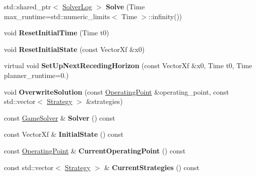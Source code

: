 \begin{DoxyCompactItemize}
\item 
std\+::shared\+\_\+ptr$<$ \hyperlink{classilqgames_1_1_solver_log}{Solver\+Log} $>$ {\bfseries Solve} (Time max\+\_\+runtime=std\+::numeric\+\_\+limits$<$ Time $>$\+::infinity())\hypertarget{classilqgames_1_1_problem_ab12b009e19551f6578af998789497927}{}\label{classilqgames_1_1_problem_ab12b009e19551f6578af998789497927}

\item 
void {\bfseries Reset\+Initial\+Time} (Time t0)\hypertarget{classilqgames_1_1_problem_a559eb8753ba5b82afeb6c69dd722a306}{}\label{classilqgames_1_1_problem_a559eb8753ba5b82afeb6c69dd722a306}

\item 
void {\bfseries Reset\+Initial\+State} (const Vector\+Xf \&x0)\hypertarget{classilqgames_1_1_problem_ac59f8a49b028baa3d72cb065d35b8193}{}\label{classilqgames_1_1_problem_ac59f8a49b028baa3d72cb065d35b8193}

\item 
virtual void {\bfseries Set\+Up\+Next\+Receding\+Horizon} (const Vector\+Xf \&x0, Time t0, Time planner\+\_\+runtime=0.)\hypertarget{classilqgames_1_1_problem_adada206413bc775f078653da9c2ed033}{}\label{classilqgames_1_1_problem_adada206413bc775f078653da9c2ed033}

\item 
void {\bfseries Overwrite\+Solution} (const \hyperlink{structilqgames_1_1_operating_point}{Operating\+Point} \&operating\+\_\+point, const std\+::vector$<$ \hyperlink{structilqgames_1_1_strategy}{Strategy} $>$ \&strategies)\hypertarget{classilqgames_1_1_problem_a14744049661872191758323a4947f072}{}\label{classilqgames_1_1_problem_a14744049661872191758323a4947f072}

\item 
const \hyperlink{classilqgames_1_1_game_solver}{Game\+Solver} \& {\bfseries Solver} () const \hypertarget{classilqgames_1_1_problem_a5587e930ff86056f3ec7d2d01b43e4e5}{}\label{classilqgames_1_1_problem_a5587e930ff86056f3ec7d2d01b43e4e5}

\item 
const Vector\+Xf \& {\bfseries Initial\+State} () const \hypertarget{classilqgames_1_1_problem_a9b4d86b6f76908fdfc5ac82aae9320cb}{}\label{classilqgames_1_1_problem_a9b4d86b6f76908fdfc5ac82aae9320cb}

\item 
const \hyperlink{structilqgames_1_1_operating_point}{Operating\+Point} \& {\bfseries Current\+Operating\+Point} () const \hypertarget{classilqgames_1_1_problem_a49a937329474c57437592f09246c6517}{}\label{classilqgames_1_1_problem_a49a937329474c57437592f09246c6517}

\item 
const std\+::vector$<$ \hyperlink{structilqgames_1_1_strategy}{Strategy} $>$ \& {\bfseries Current\+Strategies} () const \hypertarget{classilqgames_1_1_problem_adb664a8d453bd4431789faf66d95a06a}{}\label{classilqgames_1_1_problem_adb664a8d453bd4431789faf66d95a06a}

\end{DoxyCompactItemize}
